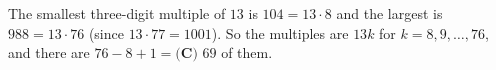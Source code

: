 The smallest three-digit multiple of $13$ is $104=13\cdot8$ and the largest is $988=13\cdot76$ (since $13\cdot77=1001$). So the multiples are $13k$ for $k=8,9,\dots,76$, and there are $76-8+1=\boxed{\textbf{(C) }69}$ of them.
